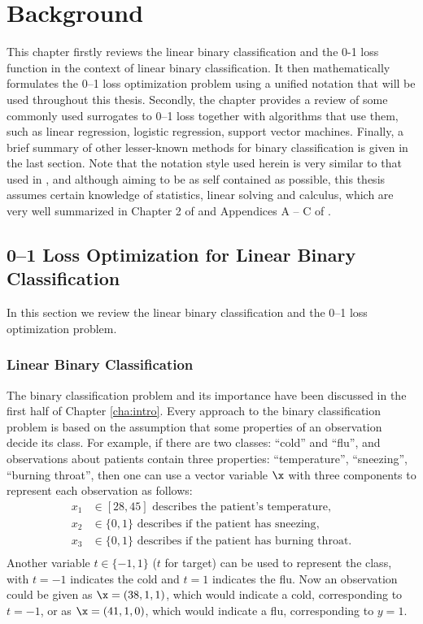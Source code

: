 \section{Background}
\label{cha:background}

This chapter firstly reviews the linear binary classification and the
0-1 loss function in the context of linear binary classification. It
then mathematically formulates the 0--1 loss optimization problem
using a unified notation that will be used throughout this
thesis. Secondly, the chapter provides a review of some commonly used
surrogates to 0--1 loss together with algorithms that use them, such
as linear regression, logistic regression, support vector
machines. Finally, a brief summary of other lesser-known methods for
binary classification is given in the last section. Note that the
notation style used herein is very similar to that used in
\cite{bishop06}, and although aiming to be as self contained as
possible, this thesis assumes certain knowledge of statistics, linear
solving and calculus, which are very well summarized in Chapter 2 of
\cite{bishop06} and Appendices A -- C of \cite{boyd04}.



\subsection{0--1 Loss Optimization for Linear Binary Classification}
\label{sec:bgr.formulation}

In this section we review the linear binary classification and the 0--1 loss optimization problem.

\subsubsection{Linear Binary Classification}
\label{ssec:binclass}

The binary classification problem and its importance have been discussed in the first half of Chapter \ref{cha:intro}. Every approach to the binary classification problem is based on the assumption that some properties of an observation decide its class. For example, if there are two classes: ``cold'' and ``flu'', and observations about patients contain three properties: ``temperature'', ``sneezing'', ``burning throat'', then one can use a vector variable $\x$ with three components to represent each observation as follows:
\[ \begin{aligned}
x_1 & \in [28, 45]  \text{ describes the patient's temperature}, \\
x_2 & \in \{ 0,1 \}  \text{ describes if the patient has sneezing}, \\
x_3 & \in \{ 0,1 \}  \text{ describes if the patient has burning throat}.\\
\end{aligned} \]
Another variable $t \in \{ -1,1 \}$ ($t$ for target) can be used to represent the class, with $t=-1$ indicates the cold and $t=1$ indicates the flu. Now an observation could be given as $\x = (38, 1, 1)$, which would indicate a cold, corresponding to $t = -1$, or as $\x = (41, 1, 0)$, which would indicate a flu, corresponding to $y = 1$. 

